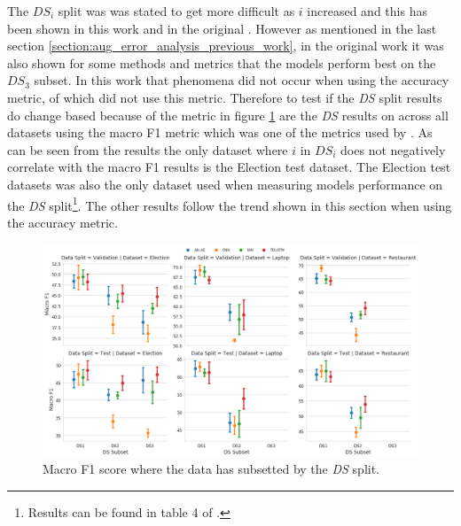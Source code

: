 The $DS_i$ split was  was stated to get more difficult as $i$ increased and this has been shown in this work and in the original \citep{aug_wang-etal-2017-tdparse}. However as mentioned in the last section \ref{section:aug_error_analysis_previous_work}, in the original work it was also shown for some methods and metrics that the models perform best on the $DS_3$ subset. In this work that phenomena did not occur when using the accuracy metric, of which \citet{aug_wang-etal-2017-tdparse} did not use this metric. Therefore to test if the \textit{DS} split results do change based because of the metric in figure \ref{fig:aug_baseline_sentiment_f1_ds_all} are the \textit{DS} results on across all datasets using the macro F1 metric which was one of the metrics used by \citet{aug_wang-etal-2017-tdparse}. As can be seen from the results the only dataset where $i$ in $DS_i$ does not negatively correlate with the macro F1 results is the Election test dataset. The Election test datasets was also the only dataset \citet{aug_wang-etal-2017-tdparse} used when measuring models performance on the \textit{DS} split\footnote{Results can be found in table 4 of \citet{aug_wang-etal-2017-tdparse}.}. The other results follow the trend shown in this section when using the accuracy metric. 

\begin{figure}[h!]
    \centering
    \includegraphics[scale=0.3]{images/augmentation/methods_performance/baseline/sentiment_f1_ds_all.png}
    \caption{Macro F1 score where the data has subsetted by the \textit{DS} split.}
    \label{fig:aug_baseline_sentiment_f1_ds_all}
\end{figure}

